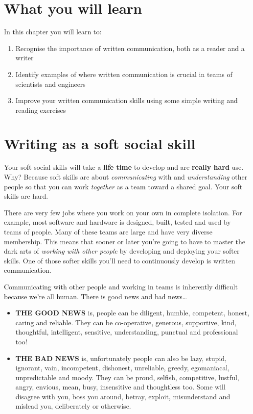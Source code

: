 \documentclass[
]{book}
\providecommand{\tightlist}{%
  \setlength{\itemsep}{0pt}\setlength{\parskip}{0pt}}
\begin{document}
\hypertarget{what-you-will-learn}{%
\section{What you will learn}\label{what-you-will-learn}}

In this chapter you will learn to:

\begin{enumerate}
\def\labelenumi{\arabic{enumi}.}
\tightlist
\item
  Recognise the importance of written communication, both as a reader and a writer
\item
  Identify examples of where written communication is crucial in teams of scientists and engineers
\item
  Improve your written communication skills using some simple writing and reading exercises
\end{enumerate}

\hypertarget{softwrite}{%
\section{Writing as a soft social skill}\label{softwrite}}

Your soft social skills will take a \textbf{life time} to develop and are \textbf{really hard} use. Why? Because soft skills are about \emph{communicating} with and \emph{understanding} other people so that you can work \emph{together} as a team toward a shared goal. Your soft skills are hard.

There are very few jobs where you work on your own in complete isolation. For example, most software and hardware is designed, built, tested and used by teams of people. Many of these teams are large and have very diverse membership. This means that sooner or later you're going to have to master the dark arts of \emph{working with other people} by developing and deploying your softer skills. One of those softer skills you'll need to continuously develop is written communication.

Communicating with other people and working in teams is inherently difficult because we're all human. There is good news and bad news\ldots{}

\begin{itemize}
\tightlist
\item
  \textbf{THE GOOD NEWS} is, people can be diligent, humble, competent, honest, caring and reliable. They can be co-operative, generous, supportive, kind, thoughtful, intelligent, sensitive, understanding, punctual and professional too!
\item
  \textbf{THE BAD NEWS} is, unfortunately people can also be lazy, stupid, ignorant, vain, incompetent, dishonest, unreliable, greedy, egomaniacal, unpredictable and moody. They can be proud, selfish, competitive, lustful, angry, envious, mean, busy, insensitive and thoughtless too. Some will disagree with you, boss you around, betray, exploit, misunderstand and mislead you, deliberately or otherwise. \citep{sevendeadly}
\end{itemize}
\end{document}
